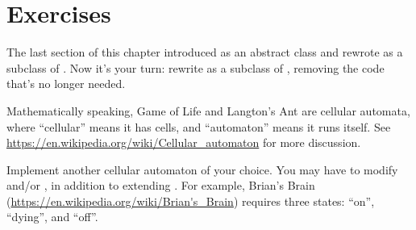 \section{Exercises}

\begin{exercise}

The last section of this chapter introduced  as an abstract class and rewrote  as a subclass of .
Now it's your turn: rewrite  as a subclass of , removing the code that's no longer needed.

\end{exercise}


\begin{exercise}

Mathematically speaking, Game of Life and Langton's Ant are cellular automata, where ``cellular'' means it has cells, and ``automaton'' means it runs itself.
See \url{https://en.wikipedia.org/wiki/Cellular_automaton} for more discussion.

Implement another cellular automaton of your choice.
You may have to modify  and/or , in addition to extending .
For example, Brian's Brain (\url{https://en.wikipedia.org/wiki/Brian's_Brain}) requires three states: ``on'', ``dying'', and ``off''.

\end{exercise}

